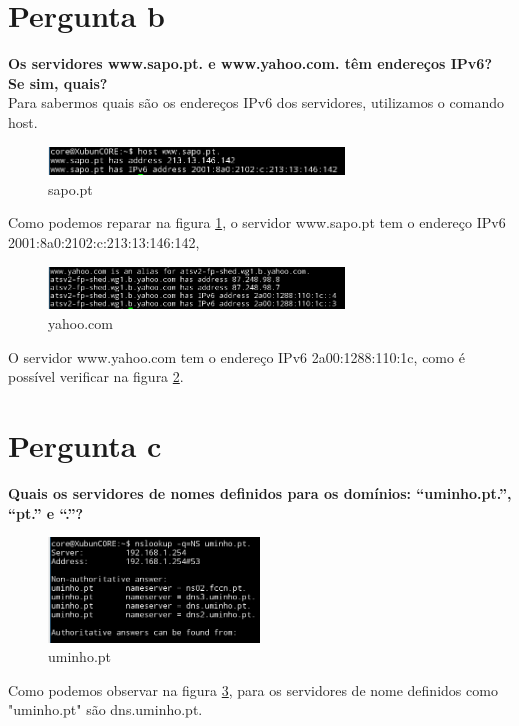 \documentclass[a4paper]{report}
\begin{document}
\section{Pergunta b}
\textbf{Os servidores www.sapo.pt. e www.yahoo.com. têm endereços IPv6? Se sim,
quais?}\\
Para sabermos quais são os endereços IPv6 dos servidores, utilizamos o comando
host.

\begin{figure}[H]
    \centering 
    \includegraphics[width=0.7\textwidth]{images/sapopt.png}  
    \caption{sapo.pt}
    \label{fig:sapopt}
\end{figure}
Como podemos reparar na figura \ref{fig:sapopt}, o servidor www.sapo.pt tem o endereço 
IPv6 2001:8a0:2102:c:213:13:146:142,

\begin{figure}[H]
    \centering 
    \includegraphics[width=0.7\textwidth]{images/yahoocom.png}  
    \caption{yahoo.com}
    \label{fig:yahoocom}
\end{figure}
O servidor www.yahoo.com tem o endereço IPv6 2a00:1288:110:1c, como é
possível verificar na figura \ref{fig:yahoocom}.

\section{Pergunta c}
\textbf{Quais os servidores de nomes definidos para os domínios: “uminho.pt.”,
“pt.” e “.”?}
\begin{figure}[H]
    \centering 
    \includegraphics[width=0.5\textwidth]{images/uminhopt.png}  
    \caption{uminho.pt}
    \label{fig:uminhopt}
\end{figure}
Como podemos observar na figura \ref{fig:uminhopt}, para os servidores de nome 
definidos como "uminho.pt" são dns.uminho.pt.
\end{document}

